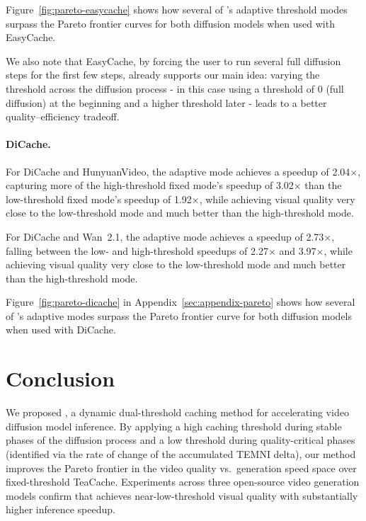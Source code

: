 \documentclass{article}
\begin{document}
Figure~\ref{fig:pareto-easycache} shows how several of \system's adaptive threshold modes surpass the Pareto frontier curves for both diffusion models when used with EasyCache.

We also note that EasyCache, by forcing the user to run several full diffusion steps for the first few steps, already supports our main idea: varying the threshold across the diffusion process - in this case using a threshold of 0 (full diffusion) at the beginning and a higher threshold later - leads to a better quality--efficiency tradeoff.

\paragraph{DiCache.}
For DiCache and HunyuanVideo, the adaptive mode achieves a speedup of 2.04$\times$, capturing more of the high-threshold fixed mode's speedup of 3.02$\times$ than the low-threshold fixed mode's speedup of 1.92$\times$, while achieving visual quality very close to the low-threshold mode and much better than the high-threshold mode.

For DiCache and Wan~2.1, the adaptive mode achieves a speedup of 2.73$\times$, falling between the low- and high-threshold speedups of 2.27$\times$ and 3.97$\times$, while achieving visual quality very close to the low-threshold mode and much better than the high-threshold mode.

Figure~\ref{fig:pareto-dicache} in Appendix~\ref{sec:appendix-pareto} shows how several of \system's adaptive modes surpass the Pareto frontier curve for both diffusion models when used with DiCache.

\section{Conclusion}

We proposed \system, a dynamic dual-threshold caching method for accelerating video diffusion model inference. By applying a high caching threshold during stable phases of the diffusion process and a low threshold during quality-critical phases (identified via the rate of change of the accumulated TEMNI delta), our method improves the Pareto frontier in the video quality vs.\ generation speed space over fixed-threshold TeaCache. Experiments across three open-source video generation models confirm that \system achieves near-low-threshold visual quality with substantially higher inference speedup.

\begin{ack}
\end{ack}
\end{document}
